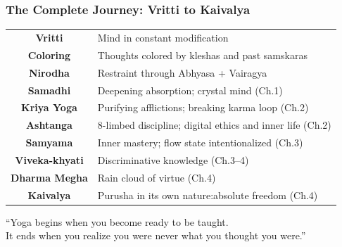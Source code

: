 \begin{frame}[fragile]\frametitle{The Complete Journey: Vritti to Kaivalya}

\begin{center}
\begin{tabular}{c@{\ $\longrightarrow$\ }l}
\textbf{Vritti} & Mind in constant modification \\
\textbf{Coloring} & Thoughts colored by kleshas and past samskaras \\
\textbf{Nirodha} & Restraint through Abhyasa + Vairagya \\
\textbf{Samadhi} & Deepening absorption; crystal mind (Ch.1) \\
\textbf{Kriya Yoga} & Purifying afflictions; breaking karma loop (Ch.2) \\
\textbf{Ashtanga} & 8-limbed discipline; digital ethics and inner life (Ch.2) \\
\textbf{Samyama} & Inner mastery; flow state intentionalized (Ch.3) \\
\textbf{Viveka-khyati} & Discriminative knowledge (Ch.3–4) \\
\textbf{Dharma Megha} & Rain cloud of virtue (Ch.4) \\
\textbf{Kaivalya} & Purusha in its own nature:absolute freedom (Ch.4) \\
\end{tabular}
\end{center}

\vspace{3mm}
\begin{center}
{\large ``Yoga begins when you become ready to be taught.\\It ends when you realize you were never what you thought you were.''}
\end{center}

\end{frame}

